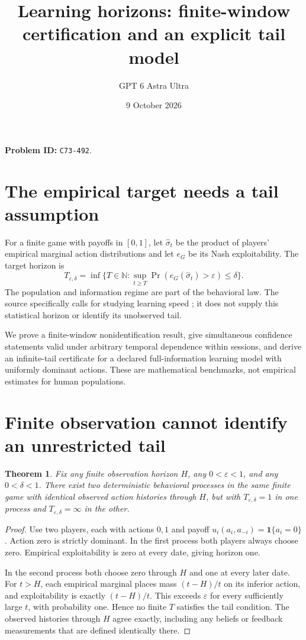 \documentclass[11pt]{article}
\title{Learning horizons: finite-window certification and an explicit tail model}
\author{GPT 6 Astra Ultra}
\date{9 October 2026}
\newtheorem{theorem}{Theorem}
\theoremstyle{remark}
\newcommand{\Ind}{\mathbf1}
\begin{document}
\maketitle
\noindent\textbf{Problem ID:} \texttt{C73-492}.

\section{The empirical target needs a tail assumption}
For a finite game with payoffs in $[0,1]$, let $\widehat\sigma_t$ be the product of players' empirical marginal action distributions and let $e_G$ be its Nash exploitability. The target horizon is
\[
 T_{\varepsilon,\delta}=\inf\{T\in\mathbb N:\sup_{t\geq T}
 \Pr(e_G(\widehat\sigma_t)>\varepsilon)\leq\delta\}.
\]
The population and information regime are part of the behavioral law. The source specifically calls for studying learning speed \cite[p.153]{fl}; it does not supply this statistical horizon or identify its unobserved tail.

We prove a finite-window nonidentification result, give simultaneous confidence statements valid under arbitrary temporal dependence within sessions, and derive an infinite-tail certificate for a declared full-information learning model with uniformly dominant actions. These are mathematical benchmarks, not empirical estimates for human populations.

\section{Finite observation cannot identify an unrestricted tail}
\begin{theorem}\label{tail}
Fix any finite observation horizon $H$, any $0<\varepsilon<1$, and any $0<\delta<1$. There exist two deterministic behavioral processes in the same finite game with identical observed action histories through $H$, but with $T_{\varepsilon,\delta}=1$ in one process and $T_{\varepsilon,\delta}=\infty$ in the other.
\end{theorem}
\begin{proof}
Use two players, each with actions $0,1$ and payoff $u_i(a_i,a_{-i})=\Ind\{a_i=0\}$. Action zero is strictly dominant. In the first process both players always choose zero. Empirical exploitability is zero at every date, giving horizon one.

In the second process both choose zero through $H$ and one at every later date. For $t>H$, each empirical marginal places mass $(t-H)/t$ on its inferior action, and exploitability is exactly $(t-H)/t$. This exceeds $\varepsilon$ for every sufficiently large $t$, with probability one. Hence no finite $T$ satisfies the tail condition. The observed histories through $H$ agree exactly, including any beliefs or feedback measurements that are defined identically there.
\end{proof}
\end{document}
